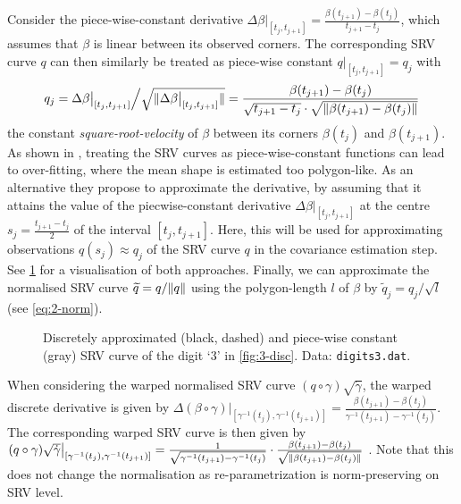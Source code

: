 Consider the piece-wise-constant derivative $\Delta \beta \big\rvert_{[t_j, t_{j+1}]} = \frac{\beta(t_{j+1}) - \beta(t_{j})}{t_{j+1} - t_j}$, which assumes that $\beta$ is linear between its observed corners. 
The corresponding SRV curve $q$ can then similarly be treated as piece-wise constant $q\big\rvert_{[t_{j},t_{j+1}]} = q_j$ with 
\begin{equation}
  q_j = \Delta \beta \big\rvert_{[t_j, t_{j+1}]} \Big/ \sqrt{\lVert\Delta \beta \big\rvert_{[t_j, t_{j+1}]}\rVert} = \frac{\beta(t_{j+1}) - \beta(t_j)}{\sqrt{t_{j+1} - t_j} \cdot \sqrt{\lVert\beta(t_{j+1}) - \beta(t_j)\rVert}}
\end{equation}
the constant \emph{square-root-velocity} of $\beta$ between its corners $\beta(t_j)$ and $\beta(t_{j+1})$.
As shown in \cite[][Fig.\ 3]{Steyer2021}, treating the SRV curves as piece-wise-constant functions can lead to over-fitting, where the mean shape is estimated too polygon-like.
As an alternative they propose to approximate the derivative, by assuming that it attains the value of the piecwise-constant derivative $\Delta \beta \big\rvert_{[t_j,t_{j+1}]}$ at the centre $s_j = \frac{t_{j+1} - t_j}{2}$ of the interval $[t_j, t_{j+1}]$.
Here, this will be used for approximating observations $q(s_j) \approx q_j$ of the SRV curve $q$ in the covariance estimation step.
See \cref{fig:3-disc-srv} for a visualisation of both approaches.
Finally, we can approximate the normalised SRV curve $\widetilde q = q / \lVert q\rVert$ using the polygon-length $l$ of $\beta$ by $\widetilde q_j = q_j \big/ \sqrt{l}$ (see \cref{eq:2-norm}).
\begin{figure}
  \centering
  \begin{subfigure}{.48\textwidth}
    \centering
  \end{subfigure}\hfill%
  \begin{subfigure}{.48\textwidth}
    \centering
    \begin{subfigure}{\textwidth}
      \centering
    \end{subfigure}
    \begin{subfigure}{\textwidth}
      \centering
    \end{subfigure}
  \end{subfigure}
  \caption{Discretely approximated (black, dashed) and piece-wise constant (gray) SRV curve of the digit \enquote*{3} in \cref{fig:3-disc}. Data: \texttt{digits3.dat}.}
  \label{fig:3-disc-srv}
\end{figure}
When considering the warped normalised SRV curve $(q \circ \gamma ) \sqrt{\dot\gamma}$, the warped discrete derivative is given by $\Delta (\beta \circ \gamma) \big\rvert_{[\gamma^{-1}(t_j), \gamma^{-1}(t_{j+1})]} = \frac{\beta(t_{j+1}) - \beta(t_{j})}{\gamma^{-1}(t_{j+1}) - \gamma^{-1}(t_j)}$.
The corresponding warped SRV curve is then given by $(q \circ \gamma) \sqrt{\dot\gamma} \big\rvert_{[\gamma^{-1}(t_j), \gamma^{-1}(t_{j+1})]} = \frac{1}{\sqrt{\gamma^{-1}(t_{j+1}) - \gamma^{-1}(t_j)}} \cdot \frac{\beta(t_{j+1}) - \beta(t_j)}{\sqrt{\lVert\beta(t_{j+1}) - \beta(t_j)\rVert}}$ \parencite[see][]{Steyer2021}.
Note that this does not change the normalisation as re-parametrization is norm-preserving on SRV level.



